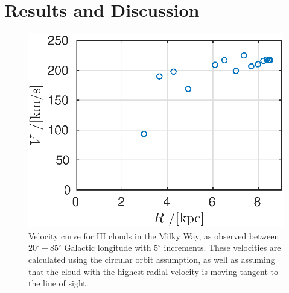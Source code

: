 \documentclass[11pt,a4paper, twocolumn,
swedish, english %
]{article}
\begin{document}
\section{Results and Discussion}
\begin{figure}\centering
\includegraphics[width=1\linewidth]{rotation_curve.eps}
\caption{Velocity curve for HI clouds in the Milky Way, as observed
  between $20^\circ{-}85^\circ$ Galactic longitude with $5^\circ$
  increments. These velocities are calculated using the circular orbit
  assumption, as well as assuming that the cloud with the highest
  radial velocity is moving tangent to the line of sight.}
\label{fig:rot}
\end{figure}
\end{document}
